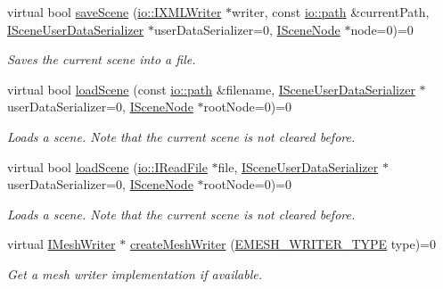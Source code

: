 \begin{DoxyCompactItemize}
virtual bool \hyperlink{classirr_1_1scene_1_1ISceneManager_a824daa42c8bcf5c5eff159a56052000d}{save\+Scene} (\hyperlink{classirr_1_1io_1_1IXMLWriter}{io\+::\+I\+X\+M\+L\+Writer} $\ast$writer, const \hyperlink{namespaceirr_1_1io_ab1bdc45edb3f94d8319c02bc0f840ee1}{io\+::path} \&current\+Path, \hyperlink{classirr_1_1scene_1_1ISceneUserDataSerializer}{I\+Scene\+User\+Data\+Serializer} $\ast$user\+Data\+Serializer=0, \hyperlink{classirr_1_1scene_1_1ISceneNode}{I\+Scene\+Node} $\ast$node=0)=0
\begin{DoxyCompactList}\small\item\em Saves the current scene into a file. \end{DoxyCompactList}\item 
virtual bool \hyperlink{classirr_1_1scene_1_1ISceneManager_aa7641dd33e84fca7946ed17047349a3e}{load\+Scene} (const \hyperlink{namespaceirr_1_1io_ab1bdc45edb3f94d8319c02bc0f840ee1}{io\+::path} \&filename, \hyperlink{classirr_1_1scene_1_1ISceneUserDataSerializer}{I\+Scene\+User\+Data\+Serializer} $\ast$user\+Data\+Serializer=0, \hyperlink{classirr_1_1scene_1_1ISceneNode}{I\+Scene\+Node} $\ast$root\+Node=0)=0
\begin{DoxyCompactList}\small\item\em Loads a scene. Note that the current scene is not cleared before. \end{DoxyCompactList}\item 
virtual bool \hyperlink{classirr_1_1scene_1_1ISceneManager_a21549d3cae3526313c37d9ed7fd08767}{load\+Scene} (\hyperlink{classirr_1_1io_1_1IReadFile}{io\+::\+I\+Read\+File} $\ast$file, \hyperlink{classirr_1_1scene_1_1ISceneUserDataSerializer}{I\+Scene\+User\+Data\+Serializer} $\ast$user\+Data\+Serializer=0, \hyperlink{classirr_1_1scene_1_1ISceneNode}{I\+Scene\+Node} $\ast$root\+Node=0)=0
\begin{DoxyCompactList}\small\item\em Loads a scene. Note that the current scene is not cleared before. \end{DoxyCompactList}\item 
virtual \hyperlink{classirr_1_1scene_1_1IMeshWriter}{I\+Mesh\+Writer} $\ast$ \hyperlink{classirr_1_1scene_1_1ISceneManager_ae9a06fb68757381f99cfe11ecbd153e6}{create\+Mesh\+Writer} (\hyperlink{namespaceirr_1_1scene_a431fa15741518ba15f6d5f2608b6cb4e}{E\+M\+E\+S\+H\+\_\+\+W\+R\+I\+T\+E\+R\+\_\+\+T\+Y\+PE} type)=0
\begin{DoxyCompactList}\small\item\em Get a mesh writer implementation if available. \end{DoxyCompactList}\item 

\end{DoxyCompactItemize}
